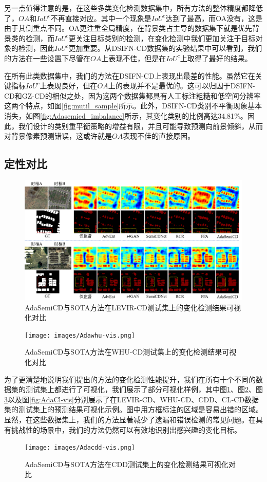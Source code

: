 \documentclass[lang=chs, degree=master, blindreview=false, adobe=false]{yanputhesis}
\begin{document}
另一点值得注意的是，在这些多类变化检测数据集中，所有方法的整体精度都降低了，$OA$和$IoU^c$不再直接对应。其中一个现象是$IoU^c$达到了最高，而OA没有，这是由于其侧重点不同。OA更注重全局精度，在背景类占主导的数据集下就是优先背景类的检测，而$IoU^c$更关注目标类别的检测，在变化检测中我们更加关注于目标对象的检测，因此$IoU^c$更加重要。从DSIFN-CD数据集的实验结果中可以看到，我们的方法在一些设置下尽管在$OA$上表现不佳，但是在$IoU^c$上取得了最好的结果。

在所有此类数据集中，我们的方法在DSIFN-CD上表现出最差的性能。虽然它在关键指标$IoU^c$上表现良好，但在$OA$上的表现并不是最优的。这可以归因于DSIFN-CD和GZ-CD的相似之处，因为这两个数据集都具有人工标注粗糙和低空间分辨率这两个特点，如图\ref{fig:mutil_sample}所示。此外，DSIFN-CD类别不平衡现象基本消失，如图\ref{fig:Adasemicd_imbalance}所示，其变化类别的比例高达34.81$\%$。因此，我们设计的类别重平衡策略的增益有限，并且可能导致预测向前景倾斜，从而对背景像素预测错误，这或许就是$OA$表现不佳的直接原因。
\subsection{定性对比}
\begin{figure}[!htbp]
  \centering
  \includegraphics[scale=0.45]{images/Adalevir-vis.png}
  \caption{
    AdaSemiCD与SOTA方法在LEVIR-CD测试集上的变化检测结果可视化对比
  }
  \label{fig:AdaLevir-vis}
\end{figure}
\begin{figure}[!htbp]
  \centering
  \texttt{[image: images/Adawhu-vis.png]}
  \caption{
    AdaSemiCD与SOTA方法在WHU-CD测试集上的变化检测结果可视化对比
  }
  \label{fig:AdaWhu-vis}
\end{figure}
为了更清楚地说明我们提出的方法的变化检测性能提升，我们在所有十个不同的数据集的测试集上都进行了可视化，我们展示了部分可视化样例，其中图\ref{fig:AdaLevir-vis}、图\ref{fig:AdaWhu-vis}、图\ref{fig:AdaCdd-vis}以及图\ref{fig:AdaCl-vis}分别展示了在LEVIR-CD、WHU-CD、CDD、CL-CD数据集的测试集上的预测结果可视化示例。图中用方框标注的区域是容易出错的区域。显然，在这些数据集上，我们的方法显著减少了遗漏和错误检测的常见问题。在具有挑战性的场景中，我们的方法仍然可以有效地识别出感兴趣的变化目标。
\begin{figure}[!htbp]
  \centering
  \texttt{[image: images/Adacdd-vis.png]}
  \caption{
    AdaSemiCD与SOTA方法在CDD测试集上的变化检测结果可视化对比
  }
  \label{fig:AdaCdd-vis}
  \end{figure}
\end{document}
